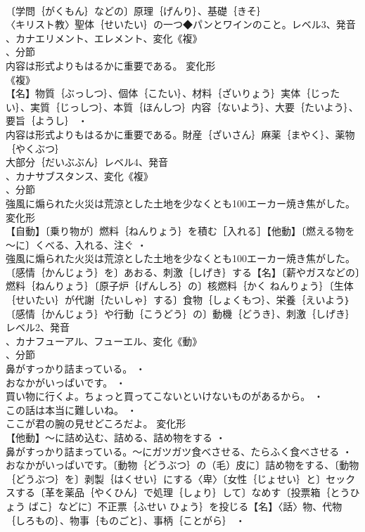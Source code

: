 \documentclass[8pt]{extreport}
\begin{document}
\begin{CJK}{UTF8}{min}
\\	〔学問｛がくもん｝などの〕原理｛げんり｝、基礎｛きそ｝
\\	〈キリスト教〉聖体｛せいたい｝の一つ◆パンとワインのこと。レベル3、発音
\\	、カナエリメント、エレメント、変化《複》
\\	、分節
\\	内容は形式よりもはるかに重要である。	変化形 
\\	《複》
\\	【名】物質｛ぶっしつ｝、個体｛こたい｝、材料｛ざいりょう｝実体｛じったい｝、実質｛じっしつ｝、本質｛ほんしつ｝内容｛ないよう｝、大要｛たいよう｝、要旨｛ようし｝ ・
\\	内容は形式よりもはるかに重要である。財産｛ざいさん｝麻薬｛まやく｝、薬物｛やくぶつ｝
\\	大部分｛だいぶぶん｝レベル4、発音
\\	、カナサブスタンス、変化《複》
\\	、分節
\\	強風に煽られた火災は荒涼とした土地を少なくとも100エーカー焼き焦がした。	変化形 
\\	【自動】〔乗り物が〕燃料｛ねんりょう｝を積む［入れる］【他動】〔燃える物を～に〕くべる、入れる、注ぐ ・
\\	強風に煽られた火災は荒涼とした土地を少なくとも100エーカー焼き焦がした。〔感情｛かんじょう｝を〕あおる、刺激｛しげき｝する【名】〔薪やガスなどの〕燃料｛ねんりょう｝〔原子炉｛げんしろ｝の〕核燃料｛かく ねんりょう｝〔生体｛せいたい｝が代謝｛たいしゃ｝する〕食物｛しょくもつ｝、栄養｛えいよう｝〔感情｛かんじょう｝や行動｛こうどう｝の〕動機｛どうき｝、刺激｛しげき｝レベル2、発音
\\	、カナフューアル、フューエル、変化《動》
\\	、分節
\\	鼻がすっかり詰まっている。 ・
\\	おなかがいっぱいです。 ・
\\	買い物に行くよ。ちょっと買ってこないといけないものがあるから。 ・
\\	この話は本当に難しいね。 ・
\\	ここが君の腕の見せどころだよ。	変化形 
\\	【他動】～に詰め込む、詰める、詰め物をする ・
\\	鼻がすっかり詰まっている。～にガツガツ食べさせる、たらふく食べさせる ・
\\	おなかがいっぱいです。〔動物｛どうぶつ｝の（毛）皮に〕詰め物をする、〔動物｛どうぶつ｝を〕剥製｛はくせい｝にする〈卑〉〔女性｛じょせい｝と〕セックスする〔革を薬品｛やくひん｝で処理｛しょり｝して〕なめす〔投票箱｛とうひょう ばこ｝などに〕不正票｛ふせい ひょう｝を投じる【名】〈話〉物、代物｛しろもの｝、物事｛ものごと｝、事柄｛ことがら｝ ・

\end{CJK}
\end{document}
